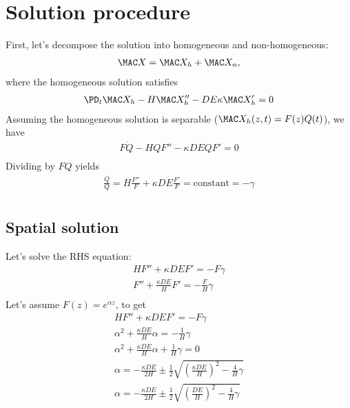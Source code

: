 \documentclass[11pt]{article}
\begin{document}
\section{Solution procedure}
First, let's decompose the solution into homogeneous and non-homogeneous:
\begin{equation}\begin{aligned}
	\MAC X = \MAC X_h + \MAC X_n, \\
\end{aligned} \end{equation}
where the homogeneous solution satisfies
\begin{equation}\begin{aligned}
	\PD_t \MAC X_h - H \MAC X_h'' - DE \kappa \MAC X_h'  = 0 \\
\end{aligned} \end{equation}
Assuming the homogeneous solution is separable ($\MAC X_h(z,t) = F(z)Q(t)$), we have
\begin{equation}\begin{aligned}
	F\dot{Q} - HQF'' - \kappa DEQF' = 0 \\
\end{aligned} \end{equation}
Dividing by $FQ$ yields
\begin{equation}\begin{aligned}
	\frac{\dot{Q}}{Q} = H \frac{F''}{F} + \kappa DE \frac{F'}{F} = \text{constant} = -\gamma \\
\end{aligned} \end{equation}
\subsection{Spatial solution}
Let's solve the RHS equation:
\begin{equation}\begin{aligned}
	H F'' + \kappa DE F' = -F \gamma \\
	F'' + \frac{\kappa DE}{H} F' = -\frac{F}{H} \gamma \\
\end{aligned} \end{equation}
Let's assume $F(z) = e^{\alpha z}$, to get
\begin{equation}\begin{aligned}
	H F'' + \kappa DE F' = - F \gamma \\
	\alpha^2 + \frac{\kappa DE}{H} \alpha = - \frac{1}{H} \gamma \\
	\alpha^2 + \frac{\kappa DE}{H} \alpha + \frac{1}{H} \gamma = 0  \\
	\alpha = -\frac{\kappa DE}{2H} \pm \frac{1}{2} \sqrt{\left(\frac{\kappa DE}{H}\right)^2 - \frac{4}{H} \gamma} \\
	\alpha = -\frac{\kappa DE}{2H} \pm \frac{1}{2} \sqrt{\left(\frac{DE}{H}\right)^2 - \frac{4}{H} \gamma} \\
\end{aligned} \end{equation}
\end{document}
